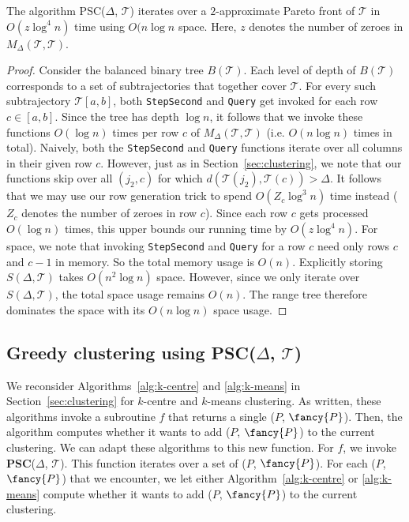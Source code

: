 %
%
%
\begin{theorem}
The algorithm PSC($\Delta$, $\mathcal{T}$) iterates over a $2$-approximate Pareto front of $\mathcal{T}$ in $O(z \log^4 n)$ time using $O(n \log n$ space. Here, $z$ denotes the number of zeroes in $M_\Delta(\mathcal{T}, \mathcal{T})$. 
\end{theorem}
%
\begin{proof}
Consider the balanced binary tree $B(\mathcal{T})$.
Each level of depth of $B(\mathcal{T})$  corresponds to a set of subtrajectories that together cover $\mathcal{T}$. 
For every such subtrajectory $\mathcal{T}[a, b]$, both \texttt{StepSecond} and \texttt{Query} get invoked for each row $c \in [a, b]$. Since the tree has depth $\log n$, it follows that we invoke these functions $O(\log n)$ times per row $c$ of ${M}_\Delta(\mathcal{T}, \mathcal{T})$ (i.e. $O(n \log n)$ times in total). 
Naively, both the \texttt{StepSecond} and \texttt{Query} functions iterate over all columns in their given row $c$. 
However, just as in Section~\ref{sec:clustering}, we note that our functions skip over all $(j_2, c)$ for which $d(\mathcal{T}(j_2), \mathcal{T}(c)) > \Delta$. 
It follows that we may use our row generation trick to spend $O(Z_c \log^3 n)$ time instead ($Z_c$ denotes {the number of} zeroes in row $c$). 
Since each row $c$ gets processed $O(\log n)$ times, this upper bounds our running time by $O(z \log^4 n)$. 
%
For space, we note that invoking \texttt{StepSecond} and \texttt{Query} for a row $c$ need only rows $c$ and $c-1$ in memory. So the total memory usage is $O(n)$. 
Explicitly storing $S(\Delta, \mathcal{T})$ takes $O(n^2 \log n)$ space.
However, since we only iterate over $S(\Delta, \mathcal{T})$, the total space usage remains $O(n)$. 
The range tree therefore dominates the space with its $O(n \log n)$ space usage.
\end{proof}
%
%
\subsection{\texorpdfstring{Greedy clustering using \textbf{PSC($\Delta$, $\mathcal{T}$)}}{Greedy clustering using PSC(D, T)}}
%
We reconsider Algorithms~\ref{alg:k-centre} and \ref{alg:k-means} in Section~\ref{sec:clustering} for $k$-centre and $k$-means clustering. 
As written, these algorithms invoke a subroutine $f$ that returns a single \pathlet ($P$, ${\fancy{P}}$).
Then, the algorithm computes whether it wants to add ($P$, ${\fancy{P}}$) to the current clustering.
We can adapt these algorithms to this new function.
For $f$, we invoke \textbf{PSC}($\Delta$, $\mathcal{T}$). 
This function iterates over a set of \pathlets  ($P$, ${\fancy{P}}$).
For each \pathlet ($P$, ${\fancy{P}}$) that we encounter, we let either Algorithm~\ref{alg:k-centre} or \ref{alg:k-means} compute whether it wants to add ($P$, ${\fancy{P}}$) to the current clustering.
%
%
